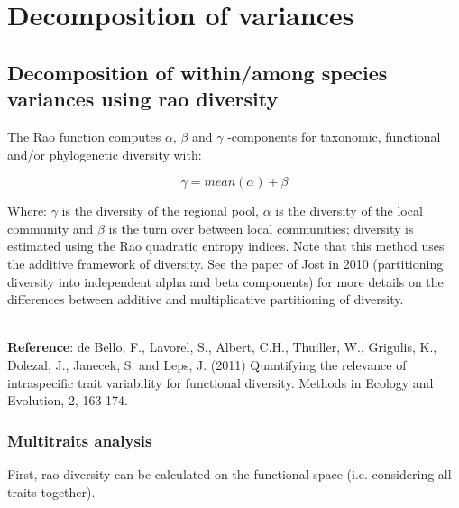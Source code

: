 \documentclass[12pt]{article}\usepackage[]{graphicx}\usepackage[]{color}
\begin{document}
\section{Decomposition of variances}

\subsection{Decomposition of within/among species variances using rao diversity}

The Rao function computes $\alpha$, $\beta$ and $\gamma$ -components for taxonomic, functional and/or phylogenetic diversity with:

$$ \gamma = mean (\alpha) + \beta $$

Where: $\gamma$ is the diversity of the regional pool, $\alpha$ is the diversity of the local community and $\beta$ is the turn over between local communities; diversity is estimated using the Rao quadratic entropy indices. Note that this method uses the additive framework of diversity. See the paper of Jost in 2010 (partitioning diversity into independent alpha and beta components) for more details on the differences between additive and multiplicative partitioning of diversity.


~\\

\textbf{Reference}: de Bello, F., Lavorel, S., Albert, C.H., Thuiller, W., Grigulis, K., Dolezal, J., Janecek, S. and Leps, J. (2011) Quantifying the relevance of intraspecific trait variability for functional diversity. Methods in Ecology and Evolution, 2, 163-174.


\subsubsection{Multitraits analysis}
First, rao diversity can be calculated on the functional  space (i.e. considering all traits together).
\end{document}
